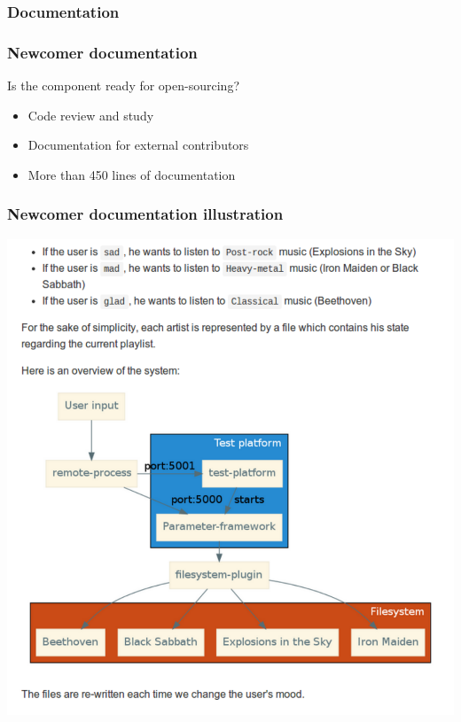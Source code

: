\subsubsection{Documentation}
\begin{frame}
    \frametitle{Newcomer documentation}
    \centering
    \begin{block}{Is the component ready for open-sourcing?}
        \begin{itemize}
            \item Code review and study
            \item Documentation for external contributors
            \item More than 450 lines of documentation
        \end{itemize}
    \end{block}
\end{frame}

\begin{frame}
    \frametitle{Newcomer documentation illustration}
    \centering
    \includegraphics[height=0.85\textheight]{../../report/src/img/tutos.pdf}
\end{frame}

